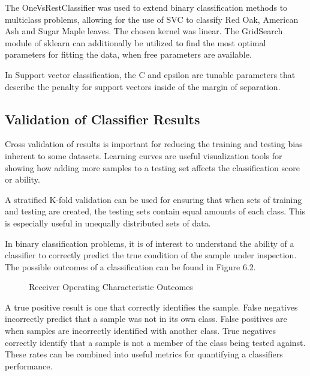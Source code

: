 %
The OneVsRestClassifier was used to extend binary classification methods to multiclass problems, allowing for the use of SVC to classify Red Oak, American Ash and Sugar Maple leaves.  The chosen kernel was linear.  The GridSearch module of sklearn can additionally be utilized to find the most optimal parameters for fitting the data, when free parameters are available.

In Support vector classification, the C and epsilon are tunable parameters that describe the penalty for support vectors inside of the margin of separation.
\subsection{Validation of Classifier Results}
Cross validation of results is important for reducing the training and testing bias inherent to some datasets.  Learning curves are useful visualization tools for showing how adding more samples to a testing set affects the classification score or ability.

A stratified K-fold validation can be used for ensuring that when sets of training and testing are created, the testing sets contain equal amounts of each class.  This is especially useful in unequally distributed sets of data.

In binary classification problems, it is of interest to understand the ability of a classifier to correctly predict the true condition of the sample under inspection.  The possible outcomes of a classification can be found in Figure 6.2.
\begin{figure}
    \begin{center}
    \end{center}
    \caption{Receiver Operating Characteristic Outcomes}
    \label{fig:polarization}
\end{figure}
A true positive result is one that correctly identifies the sample.  False negatives incorrectly predict that a sample was not in its own class.  False positives are when samples are incorrectly identified with another class.  True negatives correctly identify that a sample is not a member of the class being tested against.   These rates can be combined into useful metrics for quantifying a classifiers performance.

